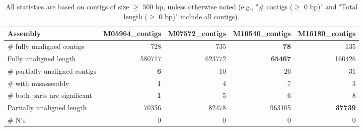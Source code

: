 \documentclass[12pt,a4paper]{article}
\begin{document}
\begin{table}[ht]
\begin{center}
\caption{All statistics are based on contigs of size $\geq$ 500 bp, unless otherwise noted (e.g., "\# contigs ($\geq$ 0 bp)" and "Total length ($\geq$ 0 bp)" include all contigs).}
\begin{tabular}{|l*{4}{|r}|}
\hline
Assembly & M05964\_contigs & M07572\_contigs & M10540\_contigs & M16180\_contigs \\ \hline
\# fully unaligned contigs & 728 & 735 & {\bf 78} & 135 \\ \hline
Fully unaligned length & 580717 & 623772 & {\bf 65467} & 160426 \\ \hline
\# partially unaligned contigs & {\bf 6} & 10 & 26 & 31 \\ \hline
\hspace{5mm}\# with misassembly & {\bf 1} & 4 & 7 & 3 \\ \hline
\hspace{5mm}\# both parts are significant & {\bf 1} & 5 & 6 & 8 \\ \hline
Partially unaligned length & 70356 & 82478 & 963105 & {\bf 37739} \\ \hline
\# N's & 0 & 0 & 0 & 0 \\ \hline
\end{tabular}
\end{center}
\end{table}
\end{document}
